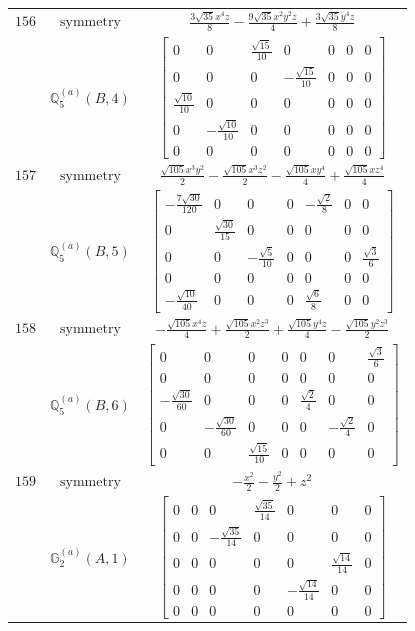 \documentclass[fleqn,8pt,landscape]{jsarticle}
\begin{document}
\begin{longtable}{ccc}
$ 156 $ & $ \text{symmetry} $ & $ \frac{3 \sqrt{35} x^{4} z}{8} - \frac{9 \sqrt{35} x^{2} y^{2} z}{4} + \frac{3 \sqrt{35} y^{4} z}{8} $ \\
$  $ & $ \mathbb{Q}_{5}^{(a)}(B,4) $ & $ \begin{bmatrix} 0 & 0 & \frac{\sqrt{15}}{10} & 0 & 0 & 0 & 0 \\ 0 & 0 & 0 & - \frac{\sqrt{15}}{10} & 0 & 0 & 0 \\ \frac{\sqrt{10}}{10} & 0 & 0 & 0 & 0 & 0 & 0 \\ 0 & - \frac{\sqrt{10}}{10} & 0 & 0 & 0 & 0 & 0 \\ 0 & 0 & 0 & 0 & 0 & 0 & 0 \end{bmatrix} $ \\ \hline
$ 157 $ & $ \text{symmetry} $ & $ \frac{\sqrt{105} x^{3} y^{2}}{2} - \frac{\sqrt{105} x^{3} z^{2}}{2} - \frac{\sqrt{105} x y^{4}}{4} + \frac{\sqrt{105} x z^{4}}{4} $ \\
$  $ & $ \mathbb{Q}_{5}^{(a)}(B,5) $ & $ \begin{bmatrix} - \frac{7 \sqrt{30}}{120} & 0 & 0 & 0 & - \frac{\sqrt{2}}{8} & 0 & 0 \\ 0 & \frac{\sqrt{30}}{15} & 0 & 0 & 0 & 0 & 0 \\ 0 & 0 & - \frac{\sqrt{5}}{10} & 0 & 0 & 0 & \frac{\sqrt{3}}{6} \\ 0 & 0 & 0 & 0 & 0 & 0 & 0 \\ - \frac{\sqrt{10}}{40} & 0 & 0 & 0 & \frac{\sqrt{6}}{8} & 0 & 0 \end{bmatrix} $ \\ \hline
$ 158 $ & $ \text{symmetry} $ & $ - \frac{\sqrt{105} x^{4} z}{4} + \frac{\sqrt{105} x^{2} z^{3}}{2} + \frac{\sqrt{105} y^{4} z}{4} - \frac{\sqrt{105} y^{2} z^{3}}{2} $ \\
$  $ & $ \mathbb{Q}_{5}^{(a)}(B,6) $ & $ \begin{bmatrix} 0 & 0 & 0 & 0 & 0 & 0 & \frac{\sqrt{3}}{6} \\ 0 & 0 & 0 & 0 & 0 & 0 & 0 \\ - \frac{\sqrt{30}}{60} & 0 & 0 & 0 & \frac{\sqrt{2}}{4} & 0 & 0 \\ 0 & - \frac{\sqrt{30}}{60} & 0 & 0 & 0 & - \frac{\sqrt{2}}{4} & 0 \\ 0 & 0 & \frac{\sqrt{15}}{10} & 0 & 0 & 0 & 0 \end{bmatrix} $ \\ \hline
$ 159 $ & $ \text{symmetry} $ & $ - \frac{x^{2}}{2} - \frac{y^{2}}{2} + z^{2} $ \\
$  $ & $ \mathbb{G}_{2}^{(a)}(A,1) $ & $ \begin{bmatrix} 0 & 0 & 0 & \frac{\sqrt{35}}{14} & 0 & 0 & 0 \\ 0 & 0 & - \frac{\sqrt{35}}{14} & 0 & 0 & 0 & 0 \\ 0 & 0 & 0 & 0 & 0 & \frac{\sqrt{14}}{14} & 0 \\ 0 & 0 & 0 & 0 & - \frac{\sqrt{14}}{14} & 0 & 0 \\ 0 & 0 & 0 & 0 & 0 & 0 & 0 \end{bmatrix} $ \\ \hline

\end{longtable}
\end{document}
